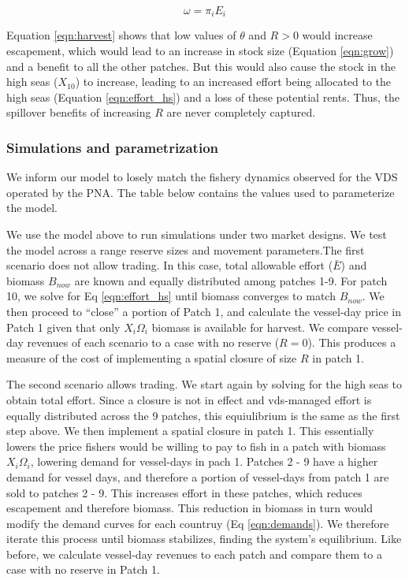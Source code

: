 \documentclass[12pt]{article}
\begin{document}
$$
\omega = \pi_iE_i
\label{eqn:license_revenue}
$$

Equation \ref{eqn:harvest} shows that low values of $\theta$ and $R > 0$ would increase escapement, which would lead to an increase in stock size (Equation \ref{eqn:grow}) and a benefit to all the other patches. But this would also cause the stock in the high seas ($X_{10}$) to increase, leading to an increased effort being allocated to the high seas (Equation \ref{eqn:effort_hs}) and a loss of these potential rents. Thus, the spillover benefits of increasing $R$ are never completely captured.

\subsubsection{Simulations and parametrization}

We inform our model to losely match the fishery dynamics observed for the VDS operated by the PNA. The table below contains the values used to parameterize the model.



We use the model above to run simulations under two market designs. We test the model across a range reserve sizes and movement parameters.The first scenario does not allow trading. In this case, total allowable effort ($\bar{E}$) and biomass $B_{now}$ are known and equally distributed among patches 1-9. For patch 10, we solve for Eq \ref{eqn:effort_hs} until biomass converges to match $B_{now}$. We then proceed to ``close'' a portion of Patch 1, and calculate the vessel-day price in Patch 1 given that only $X_i\Omega_i$ biomass is available for harvest. We compare vessel-day revenues of each scenario to a case with no reserve ($R = 0$). This produces a measure of the cost of implementing a spatial closure of size $R$ in patch 1.

The second scenario allows trading. We start again by solving for the high seas to obtain total effort. Since a closure is not in effect and vds-managed effort is equally distributed across the 9 patches, this equiulibrium is the same as the first step above. We then implement a spatial closure in patch 1. This essentially lowers the price fishers would be willing to pay to fish in a patch with biomass $X_i\Omega_i$, lowering demand for vessel-days in pach 1. Patches 2 - 9 have a higher demand for vessel days, and therefore a portion of vessel-days from patch 1 are sold to patches 2 - 9. This increases effort in these patches, which reduces escapement and therefore biomass. This reduction in biomass in turn would modify the demand curves for each countruy (Eq \ref{eqn:demands}). We therefore iterate this process until biomass stabilizes, finding the system's equilibrium. Like before, we calculate vessel-day revenues to each patch and compare them to a case with no reserve in Patch 1.
\end{document}
